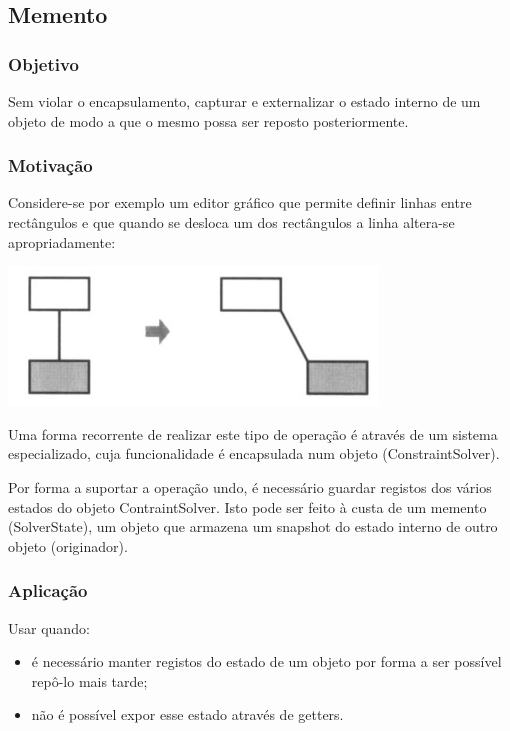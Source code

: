\subsection{Memento}

\subsubsection{Objetivo}

Sem violar o encapsulamento, capturar e externalizar o estado interno de um objeto de modo a que o mesmo possa ser reposto posteriormente.

\subsubsection{Motivação}

Considere-se por exemplo um editor gráfico que permite definir linhas entre rectângulos e que quando se desloca um dos rectângulos a linha altera-se apropriadamente:

\centerline{\includegraphics[scale=.7]{img/memento/motivation.png}}

Uma forma recorrente de realizar este tipo de operação é através de um sistema especializado, cuja funcionalidade é encapsulada num objeto (ConstraintSolver).

Por forma a suportar a operação undo, é necessário guardar registos dos vários estados do objeto ContraintSolver. Isto pode ser feito à custa de um memento (SolverState), um objeto que armazena um snapshot do estado interno de outro objeto (originador).

\subsubsection{Aplicação}

Usar quando:
\begin{itemize}
\item é necessário manter registos do estado de um objeto por forma a ser possível repô-lo mais tarde;
\item não é possível expor esse estado através de getters.
\end{itemize}

